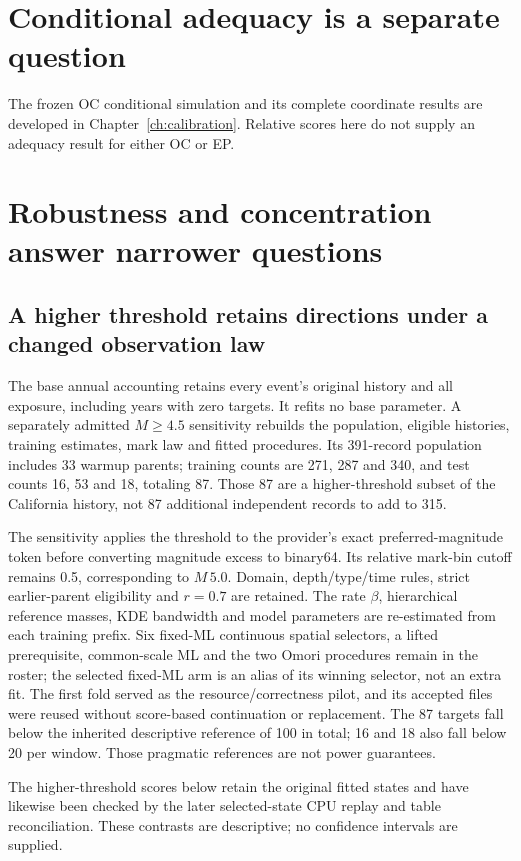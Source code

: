 \section{Conditional adequacy is a separate question}
The frozen OC conditional simulation and its complete coordinate results are developed in Chapter~\ref{ch:calibration}. Relative scores here do not supply an adequacy result for either OC or EP.
\section{Robustness and concentration answer narrower questions}

\subsection{A higher threshold retains directions under a changed observation law}

The base annual accounting retains every event's original history and all exposure, including years with zero targets. It refits no base parameter. A separately admitted $M\geq 4.5$ sensitivity rebuilds the population, eligible histories, training estimates, mark law and fitted procedures. Its 391-record population includes 33 warmup parents; training counts are 271, 287 and 340, and test counts 16, 53 and 18, totaling 87. Those 87 are a higher-threshold subset of the California history, not 87 additional independent records to add to 315.

The sensitivity applies the threshold to the provider's exact preferred-magnitude token before converting magnitude excess to binary64. Its relative mark-bin cutoff remains 0.5, corresponding to $M\,5.0$. Domain, depth/type/time rules, strict earlier-parent eligibility and $r=0.7$ are retained. The rate $\beta$, hierarchical reference masses, KDE bandwidth and model parameters are re-estimated from each training prefix. Six fixed-ML continuous spatial selectors, a lifted prerequisite, common-scale ML and the two Omori procedures remain in the roster; the selected fixed-ML arm is an alias of its winning selector, not an extra fit. The first fold served as the resource/correctness pilot, and its accepted files were reused without score-based continuation or replacement. The 87 targets fall below the inherited descriptive reference of 100 in total; 16 and 18 also fall below 20 per window. Those pragmatic references are not power guarantees.

The higher-threshold scores below retain the original fitted states and have likewise been checked by the later selected-state CPU replay and table reconciliation. These contrasts are descriptive; no confidence intervals are supplied.

